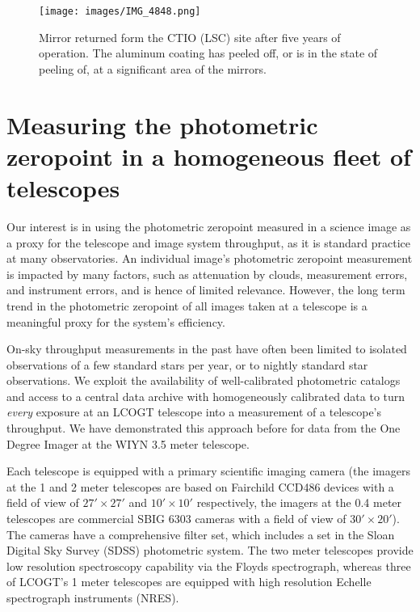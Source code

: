 \documentclass[]{spieman}
\begin{document}
\begin{figure}
\texttt{[image: images/IMG\_4848.png]}
\caption{\label{fig_mirrorpeel} Mirror returned form the CTIO (LSC) site after five years of
operation. The aluminum coating has peeled off, or is in the state of peeling of, at a significant
area of the mirrors. }
\end{figure}


\section{Measuring the photometric zeropoint in a homogeneous fleet of telescopes}


Our interest is in using the photometric zeropoint measured in a science image as a proxy for the
telescope and image system throughput, as it is standard practice at many observatories. An
individual image's photometric zeropoint measurement is impacted by many factors, such as
attenuation by clouds, measurement errors, and instrument errors, and is hence of limited relevance.
However, the long term trend in the photometric zeropoint of all images taken at a telescope is a
meaningful proxy for the system's efficiency.

On-sky throughput measurements in the past have often been limited to isolated observations of a few
standard stars per year\cite{benn2000}, or to nightly standard star observations\cite{hopp2008}. We
exploit the availability of well-calibrated photometric catalogs and access to a central
data archive with homogeneously calibrated data to turn {\em every} exposure at an LCOGT telescope
into a measurement of a telescope's throughput. We have demonstrated this approach before for data
from the One Degree Imager at the WIYN 3.5 meter telescope\cite{harbeck2014}.

Each telescope is equipped with a primary scientific imaging camera (the imagers at the 1 and 2
meter telescopes are based on Fairchild CCD486 devices with a field of view of $27' \times 27'$ and
$10' \times 10'$ respectively, the imagers at the 0.4 meter telescopes are commercial SBIG 6303
cameras with a field of view of $30' \times 20'$). The cameras have a comprehensive filter set,
which includes a set in the Sloan Digital Sky Survey (SDSS) photometric system\cite{fukugita1996}.
The two meter telescopes provide low resolution spectroscopy capability via the
Floyds\cite{brown2013} spectrograph, whereas three of LCOGT's 1 meter telescopes are equipped with
high resolution Echelle spectrograph instruments (NRES)\cite{eastman2014,siverd2016}.
\end{document}
